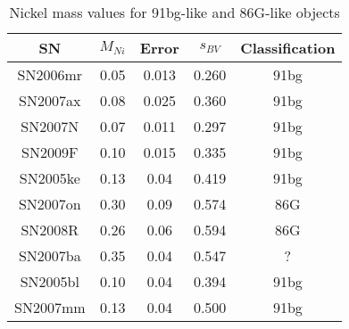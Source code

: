 \begin{table}
\begin{tabular}{ccccc}

\hline
SN & $M_{Ni}$ & Error & $s_{BV}$ & Classification \\
\hline
SN2006mr & 0.05 & 0.013 & 0.260 & 91bg \\
SN2007ax & 0.08 & 0.025 & 0.360 & 91bg \\
SN2007N & 0.07 & 0.011 & 0.297 & 91bg \\
SN2009F & 0.10 & 0.015 & 0.335 & 91bg \\
SN2005ke & 0.13 & 0.04 & 0.419 & 91bg \\
SN2007on & 0.30 & 0.09 & 0.574 & 86G \\
SN2008R & 0.26 & 0.06 & 0.594 & 86G \\
SN2007ba & 0.35 & 0.04 & 0.547 & ? \\
SN2005bl & 0.10 & 0.04 & 0.394 & 91bg \\
SN2007mm & 0.13 & 0.04 & 0.500 & 91bg \\
\hline
\end{tabular}
\caption{Nickel mass values for 91bg-like and 86G-like objects}
\end{table}

